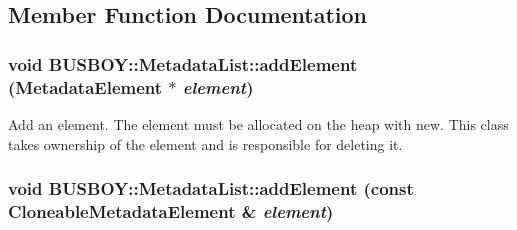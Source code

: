 \subsection{Member Function Documentation}
\hypertarget{classBUSBOY_1_1MetadataList_a3e98fddefa5918a97bbf88545354d5a3}{
\subsubsection[{addElement}]{\setlength{\rightskip}{0pt plus 5cm}void BUSBOY::MetadataList::addElement ({\bf MetadataElement} $\ast$ {\em element})}}
\label{classBUSBOY_1_1MetadataList_a3e98fddefa5918a97bbf88545354d5a3}


Add an element. The element must be allocated on the heap with new. This class takes ownership of the element and is responsible for deleting it. \hypertarget{classBUSBOY_1_1MetadataList_aa2cc62a6e005b48aa41fbb7e69118de3}{
\subsubsection[{addElement}]{\setlength{\rightskip}{0pt plus 5cm}void BUSBOY::MetadataList::addElement (const {\bf CloneableMetadataElement} \& {\em element})}}
\label{classBUSBOY_1_1MetadataList_aa2cc62a6e005b48aa41fbb7e69118de3}


